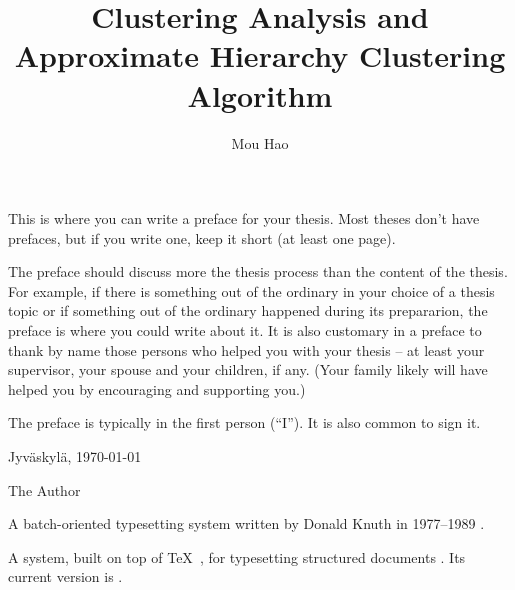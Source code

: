 \documentclass[utf8,english]{gradu3}
\begin{document}
\title{Clustering Analysis and Approximate Hierarchy Clustering Algorithm}

\author{Mou Hao}


\maketitle

\preface
This is where you can write a preface for your thesis.  Most theses
don't have prefaces, but if you write one, keep it short (at least one
page).

The preface should discuss more the thesis process than the content of
the thesis.  For example, if there is something out of the ordinary in
your choice of a thesis topic or if something out of the ordinary
happened during its prepararion, the preface is where you could write
about it.  It is also customary in a preface to thank by name those
persons who helped you with your thesis -- at least your supervisor,
your spouse and your children, if any.  (Your family likely will have
helped you by encouraging and supporting you.)

The preface is typically in the first person (``I'').  It is also common
to sign it.

Jyväskylä, \today

\bigskip

The Author

\begin{thetermlist}
\item[\TeX] A batch-oriented typesetting system written by 
Donald Knuth in 1977--1989 \parencite[see][]{knuth86:_texbook}. 
\item[\LaTeX] A system, built on top of \TeX\
  \parencite{knuth86:_texbook}, for typesetting structured
  documents \parencite[see][]{lamport94:_latex}.  Its current version
  is \LaTeXe.
\end{thetermlist}
\end{document}
